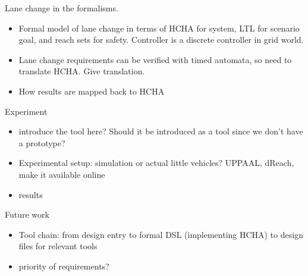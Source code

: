 Lane change in the formalisms.
\begin{itemize}	
	\item Formal model of lane change in terms of HCHA for system, LTL for scenario goal, and reach sets for safety. Controller is a discrete controller in grid world.
	
	\item Lane change requirements can be verified with timed automata, so need to translate HCHA. Give translation.
	
	\item How results are mapped back to HCHA
	
\end{itemize}


Experiment
\begin{itemize}
	\item introduce the tool here? Should it be introduced as a tool since we don't have a prototype?
	
	\item Experimental setup: simulation or actual little vehicles? UPPAAL, dReach, make it available online
	
	\item results
	
\end{itemize}

Future work
\begin{itemize}
	\item Tool chain: from design entry to formal DSL (implementing HCHA) to design files for relevant tools
	\item priority of requirements?
\end{itemize}